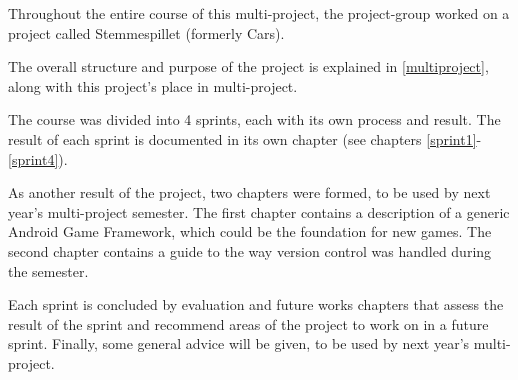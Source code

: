 Throughout the entire course of this multi-project, the project-group worked on a project called Stemmespillet (formerly Cars).

The overall structure and purpose of the project is explained in \cref{multiproject}, along with this project's place in multi-project.

The course was divided into 4 sprints, each with its own process and result.
The result of each sprint is documented in its own chapter (see chapters \ref{sprint1}-\ref{sprint4}).

As another result of the project, two chapters were formed, to be used by next year's multi-project semester.
The first chapter contains a description of a generic Android Game Framework, which could be the foundation for new games.
The second chapter contains a guide to the way version control was handled during the semester.

Each sprint is concluded by evaluation and future works chapters that assess the result of the sprint and recommend areas of the project to work on in a future sprint.
Finally, some general advice will be given, to be used by next year's multi-project.